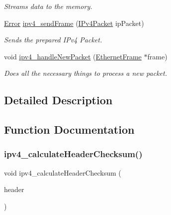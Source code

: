 \begin{DoxyCompactItemize}
\begin{DoxyCompactList}\small\item\em Streams data to the memory. \end{DoxyCompactList}\item 
\mbox{\hyperlink{error_8h_ada9d6bcf34dabaf048e197cb7b69fa6a}{Error}} \mbox{\hyperlink{group__ip_ga8bd7900cb9a8af580a2fe0fbb9f559d2}{ipv4\+\_\+send\+Frame}} (\mbox{\hyperlink{ipv4_types_8h_a1a3db8172a6bdf4bb1957929ca11710c}{I\+Pv4\+Packet}} ip\+Packet)
\begin{DoxyCompactList}\small\item\em Sends the prepared I\+Pv4 Packet. \end{DoxyCompactList}\item 
void \mbox{\hyperlink{group__ip_ga5de57cac56575029b85390fc8ac1b8ca}{ipv4\+\_\+handle\+New\+Packet}} (\mbox{\hyperlink{ethernet_types_8h_a4ebb2d31f9c7739f76b97c8ee0a7b702}{Ethernet\+Frame}} $\ast$frame)
\begin{DoxyCompactList}\small\item\em Does all the necessary things to process a new packet. \end{DoxyCompactList}\end{DoxyCompactItemize}


\subsection{Detailed Description}


\subsection{Function Documentation}
\mbox{\label{group__ip_ga09274e15872e0cab31afe677f92a0865}} 
\subsubsection{\texorpdfstring{ipv4\_calculateHeaderChecksum()}{ipv4\_calculateHeaderChecksum()}}
{\footnotesize\ttfamily void ipv4\+\_\+calculate\+Header\+Checksum (\begin{DoxyParamCaption}\item[{\mbox{\hyperlink{ipv4_types_8h_a2156b3eb915651d02d24799ac03a602b}{I\+Pv4\+Header}} $\ast$}]{header }\end{DoxyParamCaption})}



